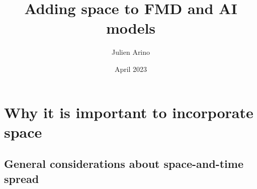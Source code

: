 \documentclass[aspectratio=43]{beamer}
\title{Adding space to FMD and AI models}
\author{Julien Arino}
\date{April 2023}
\begin{document}

\begin{frame}
	\titlepage
  \end{frame}
  \addtocounter{page}{-1}
  
\begin{frame}
	\tableofcontents[hidesubsections]
  \end{frame}
  \addtocounter{page}{-1}
  
	



\section{Why it is important to incorporate space}

\subsection{General considerations about space-and-time spread}
\end{document}
